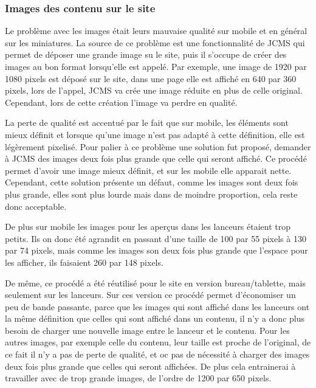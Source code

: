 \documentclass[12pt,a4paper]{article}
\begin{document}
\subsubsection{Images des contenu sur le site}
Le problème avec les images était leurs mauvaise qualité sur mobile et en général sur les miniatures. La source de ce problème est une fonctionnalité de JCMS qui permet de déposer une grande image su le site, puis il s'occupe de créer des images au bon format lorsqu'elle est appelé. Par exemple, une image de 1920 par 1080 pixels est déposé sur le site, dans une page elle est affiché en 640 par 360 pixels, lors de l'appel, JCMS va crée une image réduite en plus de celle original. Cependant, lors de cette création l'image va perdre en qualité.\par
\medskip
La perte de qualité est accentué par le fait que sur mobile, les éléments sont mieux définit et lorsque qu'une image n'est pas adapté à cette définition, elle est légèrement pixelisé. Pour palier à ce problème une solution fut proposé, demander à JCMS des images deux fois plus grande que celle qui seront affiché. Ce procédé permet d'avoir une image mieux définit, et sur les mobile elle apparait nette. Cependant, cette solution présente un défaut, comme les images sont deux fois plus grande, elles sont plus lourde mais dans de moindre proportion, cela reste donc acceptable.\par
De plus sur mobile les images pour les aperçus dans les lanceurs étaient trop petits. Ils on donc été agrandit en passant d'une taille de 100 par 55 pixels à 130 par 74 pixels, mais comme les images son deux fois plus grande que l'espace pour les afficher, ils faisaient 260 par 148 pixels.\par 
De même, ce procédé a été réutilisé pour le site en version bureau/tablette, mais seulement sur les lanceurs. Sur ces version ce procédé permet d'économiser un peu de bande passante, parce que les images qui sont affiché dans les lanceurs ont la même définition que celles qui sont affiché dans un contenu, il n'y a donc plus besoin de charger une nouvelle image entre le lanceur et le contenu. Pour les autres images, par exemple celle du contenu, leur taille est proche de l'original, de ce fait il n'y a pas de perte de qualité, et oc pas de nécessité à charger des images deux fois plus grande que celles qui seront affichées. De plus cela entrainerai à travailler avec de trop grande images, de l'ordre de 1200 par 650 pixels.\par
\end{document}
